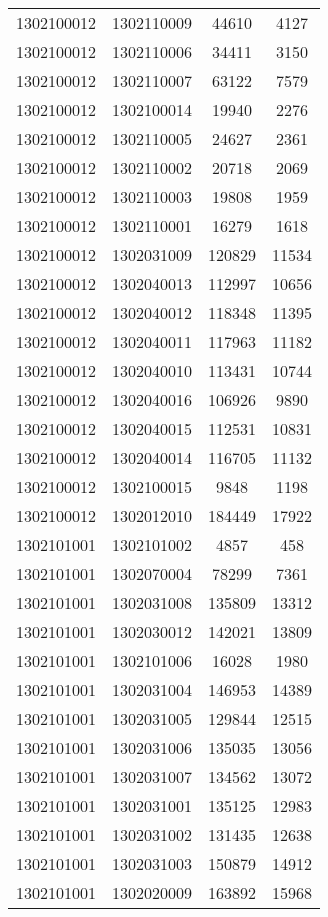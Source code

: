 \begin{longtable}[h]{llcc}
		1302100012 & 1302110009 & 44610 & 4127\\
		1302100012 & 1302110006 & 34411 & 3150\\
		1302100012 & 1302110007 & 63122 & 7579\\
		1302100012 & 1302100014 & 19940 & 2276\\
		1302100012 & 1302110005 & 24627 & 2361\\
		1302100012 & 1302110002 & 20718 & 2069\\
		1302100012 & 1302110003 & 19808 & 1959\\
		1302100012 & 1302110001 & 16279 & 1618\\
		1302100012 & 1302031009 & 120829 & 11534\\
		1302100012 & 1302040013 & 112997 & 10656\\
		1302100012 & 1302040012 & 118348 & 11395\\
		1302100012 & 1302040011 & 117963 & 11182\\
		1302100012 & 1302040010 & 113431 & 10744\\
		1302100012 & 1302040016 & 106926 & 9890\\
		1302100012 & 1302040015 & 112531 & 10831\\
		1302100012 & 1302040014 & 116705 & 11132\\
		1302100012 & 1302100015 & 9848 & 1198\\
		1302100012 & 1302012010 & 184449 & 17922\\
		1302101001 & 1302101002 & 4857 & 458\\
		1302101001 & 1302070004 & 78299 & 7361\\
		1302101001 & 1302031008 & 135809 & 13312\\
		1302101001 & 1302030012 & 142021 & 13809\\
		1302101001 & 1302101006 & 16028 & 1980\\
		1302101001 & 1302031004 & 146953 & 14389\\
		1302101001 & 1302031005 & 129844 & 12515\\
		1302101001 & 1302031006 & 135035 & 13056\\
		1302101001 & 1302031007 & 134562 & 13072\\
		1302101001 & 1302031001 & 135125 & 12983\\
		1302101001 & 1302031002 & 131435 & 12638\\
		1302101001 & 1302031003 & 150879 & 14912\\
		1302101001 & 1302020009 & 163892 & 15968\\

\end{longtable}
